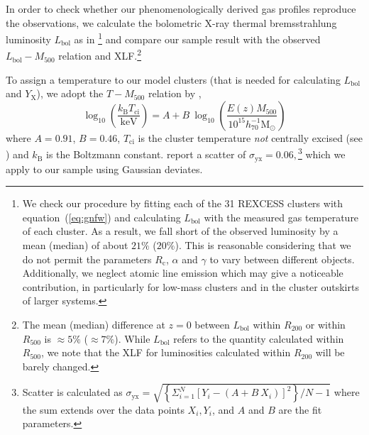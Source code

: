 \documentclass[traditabstract]{aa}
\newcommand{\rmn}{\mathrm}
\begin{document}
In order to check whether our phenomenologically derived gas profiles reproduce
the observations, we calculate the bolometric X-ray thermal bremsstrahlung
luminosity $L_{\rmn{bol}}$ as in \cite{1988xrec.book.....S}\footnote{We check
  our procedure by fitting each of the 31 REXCESS clusters with
  equation~(\ref{eq:gnfw}) and calculating $L_{\rmn{bol}}$ with the measured gas
  temperature of each cluster. As a result, we fall short of the observed
  luminosity by a mean (median) of about $21\%$ ($20\%$). This is reasonable
  considering that we do not permit the parameters $R_{\rmn{c}}$, $\alpha$ and
  $\gamma$ to vary between different objects. Additionally, we neglect atomic
  line emission which may give a noticeable contribution, in particularly for
  low-mass clusters and in the cluster outskirts of larger systems.}  and
compare our sample result with the observed $L_{\rmn{bol}} - M_{500}$ relation
and XLF.\footnote{The mean (median) difference at $z=0$ between
  $L_{\rmn{bol}}$ within $R_{200}$ or within $R_{500}$ is $\approx 5\%$ ($\approx
  7\%$). While $L_{\rmn{bol}}$ refers to the quantity calculated within
  $R_{500}$, we note that the XLF for luminosities calculated within $R_{200}$
  will be barely changed.}

To assign a temperature to our model clusters (that is needed for calculating
$L_{\rmn{bol}}$ and $Y_{\rmn{X}}$), we adopt the $T-M_{500}$ relation by
\cite{2010MNRAS.406.1773M},
\begin{equation}
\log_{10} \left( \frac{k_{\rmn{B}}T_{\rmn{ci}}}{\rmn{keV}} \right) = 
A + B~\log_{10} \left( \frac{E(z) M_{500}}{10^{15} h_{70}^{-1} \rmn{M_{\odot}}} \right)
\label{eq:temp}
\end{equation}
where $A=0.91$, $B=0.46$, $T_{\rmn{ci}}$ is the cluster temperature \emph{not}
centrally excised (see \citealp{2010MNRAS.406.1773M}) and $k_{\rmn{B}}$ is the
Boltzmann constant. \cite{2010MNRAS.406.1773M} report a scatter of
$\sigma_{\rmn{yx}} = 0.06,$\footnote{Scatter is calculated as
  $\sigma_{\rmn{yx}} = \sqrt{ \left\{ \Sigma_{i=1}^{N} [Y_{i}-(A+B~X_{i})]^{2}\right\} /
    N-1}$ where the sum extends over the data points $X_{i}, Y_{i}$, and $A$ and $B$
  are the fit parameters.} which we apply to our sample using Gaussian
deviates.
\end{document}
